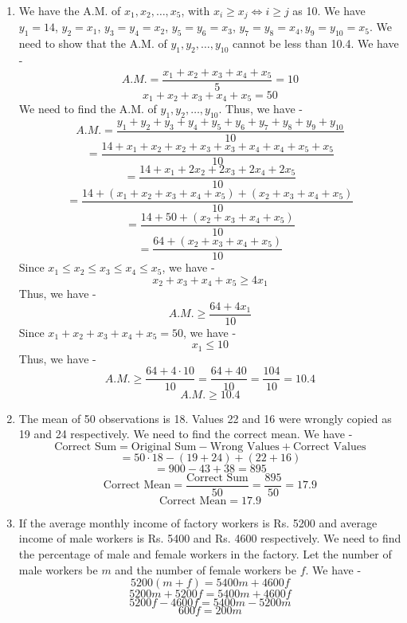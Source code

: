 \begin{enumerate}
    We know that -
    \[\sum_{i=1}^{n} i^2 = \frac{n(n+1)(2n+1)}{6}\]
    \[\sum_{i=1}^{n} i^3 = \left(\frac{n(n+1)}{2}\right)^2\]
    Thus, we have -
    \[E(X) = \frac{\left(\frac{7 \cdot 8}{2}\right)^2}{\frac{7 \cdot 8 \cdot 15}{6}} = \frac{(28)^2}{140} = \frac{784}{140} = \frac{56}{10} = 5.6\]
    \[\boxed{E(X) = 5.6
    }\]
    \item We have the A.M. of $x_1, x_2, \ldots, x_5$, with $x_i \geq x_j \iff i \geq j$ as 10. We have $y_1 = 14$, $y_2 = x_1$, $y_3 = y_4 = x_2$, $y_5 = y_6 = x_3$, $y_7 = y_8 = x_4, y_9 = y_10 = x_5$. We need to show that the A.M. of $y_1, y_2, \ldots, y_{10}$ cannot be less than 10.4. 
    We have -
    \[A.M. = \frac{x_1 + x_2 + x_3 + x_4 + x_5}{5} = 10\]
    \[x_1 + x_2 + x_3 + x_4 + x_5 = 50\]
    We need to find the A.M. of $y_1, y_2, \ldots, y_{10}$. Thus, we have -
    \[A.M. = \frac{y_1 + y_2 + y_3 + y_4 + y_5 + y_6 + y_7 + y_8 + y_9 + y_{10}}{10}\]
    \[= \frac{14 + x_1 + x_2 + x_2 + x_3 + x_3 + x_4 + x_4 + x_5 + x_5}{10}\]
    \[= \frac{14 + x_1 + 2x_2 + 2x_3 + 2x_4 + 2x_5}{10}\]
    \[= \frac{14 + (x_1 + x_2 + x_3 + x_4 + x_5) + (x_2 + x_3 + x_4 + x_5)}{10}\]
    \[= \frac{14 + 50 + (x_2 + x_3 + x_4 + x_5)}{10}\]
    \[= \frac{64 + (x_2 + x_3 + x_4 + x_5)}{10}\]
    Since $x_1 \leq x_2 \leq x_3 \leq x_4 \leq x_5$, we have -
    \[x_2 + x_3 + x_4 + x_5 \geq 4x_1\]
    Thus, we have -
    \[A.M. \geq \frac{64 + 4x_1}{10}\]
    Since $x_1 + x_2 + x_3 + x_4 + x_5 = 50$, we have -
    \[x_1 \leq 10\]
    Thus, we have -
    \[A.M. \geq \frac{64 + 4 \cdot 10}{10} = \frac{64 + 40}{10} = \frac{104}{10} = 10.4\]
    \[\boxed{A.M. \geq 10.4
    }\]
    \item The mean of 50 observations is 18. Values 22 and 16 were wrongly copied as 19 and 24 respectively. We need to find the correct mean. We have -
    \[ \text{Correct Sum} = \text{Original Sum} - \text{Wrong Values} + \text{Correct Values}\]
    \[= 50 \cdot 18 - (19 + 24) + (22 + 16)\]
    \[= 900 - 43 + 38 = 895\]
    \[ \text{Correct Mean} = \frac{\text{Correct Sum}}{50} = \frac{895}{50} = 17.9\]
    \[\boxed{\text{Correct Mean} = 17.9}\]
    \item If the average monthly income of factory workers is Rs. 5200 and average income of male workers is Rs. 5400 and Rs. 4600 respectively. We need to find the percentage of male and female workers in the factory. Let the number of male workers be $m$ and the number of female workers be $f$. We have -
    \[5200(m + f) = 5400m + 4600f\]
    \[5200m + 5200f = 5400m + 4600f\]
    \[5200f - 4600f = 5400m - 5200m\]
    \[600f = 200m\]

\end{enumerate}
